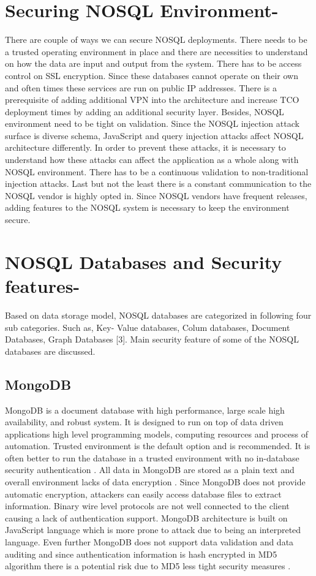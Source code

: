 \section{Securing NOSQL Environment-} There are couple of ways we can secure NOSQL deployments. There needs to be a trusted operating environment in place and there are necessities to understand on how the data are input and output from the system. There has to be access control on SSL encryption. Since these databases cannot operate on their own and often times these services are run on public IP addresses. There is a prerequisite of adding additional VPN into the architecture and increase TCO deployment times by adding an additional security layer. Besides, NOSQL environment need to be tight on validation. Since the NOSQL injection attack surface is diverse schema, JavaScript and query injection attacks affect NOSQL architecture differently. In order to prevent these attacks, it is necessary to understand how these attacks can affect the application as a whole along with NOSQL environment. There has to be a continuous validation to non-traditional injection attacks. Last but not the least there is a constant communication to the NOSQL vendor is highly opted in. Since NOSQL vendors have frequent releases, adding features to the NOSQL system is necessary to keep the environment secure.

\section{NOSQL Databases and Security features-} Based on data storage model, NOSQL databases are categorized in following four sub categories. Such as, Key- Value databases, Colum databases, Document Databases, Graph Databases [3]. Main security feature of some of the NOSQL databases are discussed.

\subsection{MongoDB}
MongoDB is a document database with high performance, large scale high availability, and robust system. It is designed to run on top of data driven applications high level programming models, computing resources and process of automation. Trusted environment is the default option and is recommended. It is often better to run the database in a trusted environment with no in-database security authentication \cite{editor03} . All data in MongoDB are stored as a plain text and overall environment lacks of data encryption \cite{editor03}. Since MongoDB does not provide automatic encryption, attackers can easily access database files to extract information. Binary wire level protocols are not well connected to the client causing a lack of authentication support. MongoDB architecture is built on JavaScript language which is more prone to attack due to being an interpreted language. Even further MongoDB does not support data validation and data auditing and since authentication information is hash encrypted in MD5 algorithm there is a potential risk due to MD5 less tight security measures \cite{editor05}.


